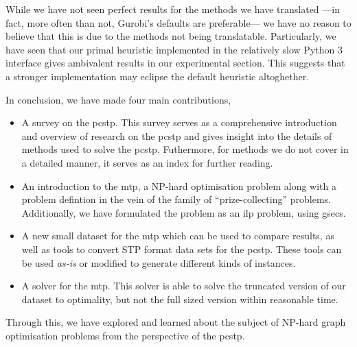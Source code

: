 While we have not seen perfect results for the methods we have translated
---in fact, more often than not, Gurobi's defaults are preferable---
we have no reason to believe that this is due to the methods not being
translatable. Particularly, we have seen that our primal heuristic implemented
in the relatively slow Python 3 interface gives ambivalent results in our experimental
section. This suggests that a stronger implementation may eclipse the default heuristic
altoghether.

In conclusion, we have made four main contributions,
\begin{itemize}
\item A survey on the \gls{pcstp}. This survey serves as a comprehensive introduction
  and overview of research on the \gls{pcstp} and gives insight into the details of
  methods used to solve the \gls{pcstp}. Futhermore, for methods we do not cover
  in a detailed manner, it serves as an index for further reading.
\item An introduction to the \acrlong{mtp}, a NP-hard optimisation problem along with
  a problem defintion in the vein of the family of ``prize-collecting'' problems.
  Additionally, we have formulated the problem as an \gls{ilp} problem, using \glspl{gsec}.
\item A new small dataset for the \gls{mtp} which can be used to compare results, as well
  as tools to convert STP format data sets for the \gls{pcstp}. These tools can be used
  \textit{as-is} or modified to generate different kinds of instances.
\item A solver for the \gls{mtp}. This solver is able to solve the truncated version of
  our dataset to optimality, but not the full sized version within reasonable time.
\end{itemize}

Through this, we have explored and learned about the subject of
NP-hard graph optimisation problems from
the perspective of the \acrlong{pcstp}.



